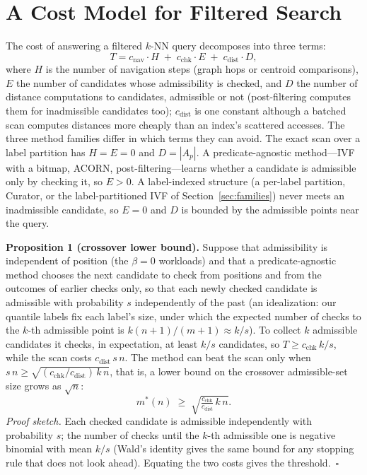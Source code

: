 \documentclass[conference]{IEEEtran}
\begin{document}
\section{A Cost Model for Filtered Search}\label{sec:model}
The cost of answering a filtered $k$-NN query decomposes into three terms:
\begin{equation}\label{eq:cost}
T = c_{\mathrm{nav}}\cdot H \;+\; c_{\mathrm{chk}}\cdot E \;+\; c_{\mathrm{dist}}\cdot D ,
\end{equation}
where $H$ is the number of navigation steps (graph hops or centroid comparisons), $E$ the number of candidates
whose admissibility is checked, and $D$ the number of distance computations to candidates, admissible or not (post-filtering computes them for inadmissible candidates too); $c_{\mathrm{dist}}$ is one constant although a batched scan computes distances more cheaply than an index's scattered accesses. The three
method families differ in which terms they can avoid. The exact scan over a label partition has $H{=}E{=}0$ and
$D{=}|A_p|$. A predicate-agnostic method---IVF with a bitmap, ACORN, post-filtering---learns whether a candidate is
admissible only by checking it, so $E>0$. A label-indexed structure (a per-label partition, Curator, or the
label-partitioned IVF of Section~\ref{sec:families}) never meets an inadmissible candidate, so $E{=}0$ and $D$ is
bounded by the admissible points near the query.

\textbf{Proposition 1 (crossover lower bound).} Suppose that admissibility is independent of position (the
$\beta{=}0$ workloads) and that a predicate-agnostic method chooses the next candidate to check from positions and from the outcomes of earlier checks only, so that each newly checked candidate is admissible with probability $s$ independently of the past (an idealization: our quantile labels fix each label's size, under which the expected number of checks to the $k$-th admissible point is $k(n{+}1)/(m{+}1)\approx k/s$). To collect $k$ admissible candidates it checks, in expectation, at least $k/s$ candidates, so
$T \ge c_{\mathrm{chk}}\,k/s$, while the scan costs $c_{\mathrm{dist}}\,s\,n$. The method can beat the scan only when
$s\,n \ge \sqrt{(c_{\mathrm{chk}}/c_{\mathrm{dist}})\,k\,n}$, that is, a lower bound on the crossover admissible-set size grows as $\sqrt{n}$:
\begin{equation}\label{eq:bound}
m^\ast(n) \;\ge\; \sqrt{\tfrac{c_{\mathrm{chk}}}{c_{\mathrm{dist}}}\,k\,n}.
\end{equation}
\emph{Proof sketch.} Each checked candidate is admissible independently with probability $s$; the number of checks
until the $k$-th admissible one is negative binomial with mean $k/s$ (Wald's identity gives the same bound for any
stopping rule that does not look ahead). Equating the two costs gives the threshold.~$\square$
\end{document}
